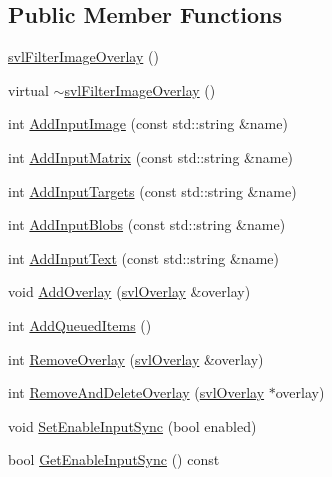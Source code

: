 \subsection*{Public Member Functions}
\begin{DoxyCompactItemize}
\item 
\hyperlink{classsvl_filter_image_overlay_ad8e6426a1d91c01b1fa244100decd246}{svl\+Filter\+Image\+Overlay} ()
\item 
virtual \hyperlink{classsvl_filter_image_overlay_a14deb084ab6aaee051606de8679afa3e}{$\sim$svl\+Filter\+Image\+Overlay} ()
\item 
int \hyperlink{classsvl_filter_image_overlay_a55209d9094f26404bec157445491875f}{Add\+Input\+Image} (const std\+::string \&name)
\item 
int \hyperlink{classsvl_filter_image_overlay_af6649342f865bcd70125a066e32bbc15}{Add\+Input\+Matrix} (const std\+::string \&name)
\item 
int \hyperlink{classsvl_filter_image_overlay_a887fa00813cbd2cc22766a51eceba371}{Add\+Input\+Targets} (const std\+::string \&name)
\item 
int \hyperlink{classsvl_filter_image_overlay_a5b1ca83eafa53f24dea3efcdcc89b083}{Add\+Input\+Blobs} (const std\+::string \&name)
\item 
int \hyperlink{classsvl_filter_image_overlay_ac2f752b66a68d996371fe0410422a571}{Add\+Input\+Text} (const std\+::string \&name)
\item 
void \hyperlink{classsvl_filter_image_overlay_a6f44d99a957f7afe7a31c611196273fc}{Add\+Overlay} (\hyperlink{classsvl_overlay}{svl\+Overlay} \&overlay)
\item 
int \hyperlink{classsvl_filter_image_overlay_a56745c5d2b39f246ed563309be041ccf}{Add\+Queued\+Items} ()
\item 
int \hyperlink{classsvl_filter_image_overlay_a21402287a1dfa675e1120f3584807cc1}{Remove\+Overlay} (\hyperlink{classsvl_overlay}{svl\+Overlay} \&overlay)
\item 
int \hyperlink{classsvl_filter_image_overlay_a29e129be2f262cbcaa946201d4614db2}{Remove\+And\+Delete\+Overlay} (\hyperlink{classsvl_overlay}{svl\+Overlay} $\ast$overlay)
\item 
void \hyperlink{classsvl_filter_image_overlay_a996c36ed3c06e33aa372a1dfc6b70199}{Set\+Enable\+Input\+Sync} (bool enabled)
\item 
bool \hyperlink{classsvl_filter_image_overlay_a36f871d87ae65b11b209a204bed0becd}{Get\+Enable\+Input\+Sync} () const 
\item 

\end{DoxyCompactItemize}
